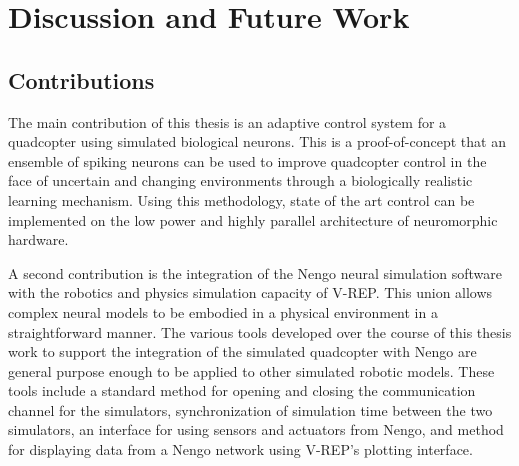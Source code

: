 \documentclass[letterpaper,12pt,titlepage,oneside,final]{book}
\begin{document}
\chapter{Discussion and Future Work} \label{chap:discussion}

\section{Contributions}


The main contribution of this thesis is an adaptive control system for a quadcopter using simulated biological neurons.
This is a proof-of-concept that an ensemble of spiking neurons can be used to improve quadcopter control in the face of uncertain and changing environments through a biologically realistic learning mechanism.
Using this methodology, state of the art control can be implemented on the low power and highly parallel architecture of neuromorphic hardware.

A second contribution is the integration of the Nengo neural simulation software with the robotics and physics simulation capacity of V-REP.
This union allows complex neural models to be embodied in a physical environment in a straightforward manner.
The various tools developed over the course of this thesis work to support the integration of the simulated quadcopter with Nengo are general purpose enough to be applied to other simulated robotic models.
These tools include a standard method for opening and closing the communication channel for the simulators, synchronization of simulation time between the two simulators, an interface for using sensors and actuators from Nengo, and method for displaying data from a Nengo network using V-REP's plotting interface.


\end{document}
